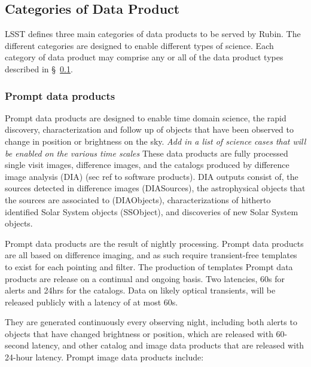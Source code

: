 \subsection{Categories of Data Product} \label{sec:dp-categories}
LSST defines three main categories of data products to be served by Rubin.
The different categories are designed to enable different types of science.
Each category of data product may comprise any or all of the data product types described in \S~\ref{sec:dp-categories}.

\subsubsection{Prompt data products} \label{sec:dp-prompt}
Prompt data products are designed to enable time domain science, the rapid discovery, characterization and follow up of objects that have been observed to change in position or brightness on the sky.
{\it Add in a list of science cases that will be enabled on the various time scales}
These data products are fully processed single visit images, difference images, and the catalogs produced by difference image analysis (DIA)  (sec ref to software products).
DIA outputs consist of,  the sources detected in difference images (DIASources), the astrophysical objects that the sources are associated to (DIAObjects),
characterizations of hitherto identified Solar System objects (SSObject), and discoveries of new Solar System objects.

Prompt data products are the result of nightly processing.
Prompt data products are all based on difference imaging, and as such require transient-free templates to  exist for each pointing and filter. The production of templates
Prompt data products are release on a continual and ongoing basis.
Two latencies, 60s for alerts and 24hrs for the catalogs. Data on likely optical transients, will be released publicly with a latency of at most 60s.

They are generated continuously every observing night, including both alerts to objects that have changed brightness or position,
which are released with 60-second latency,
and other catalog and image data products that are released with 24-hour latency.
Prompt image data products include:
